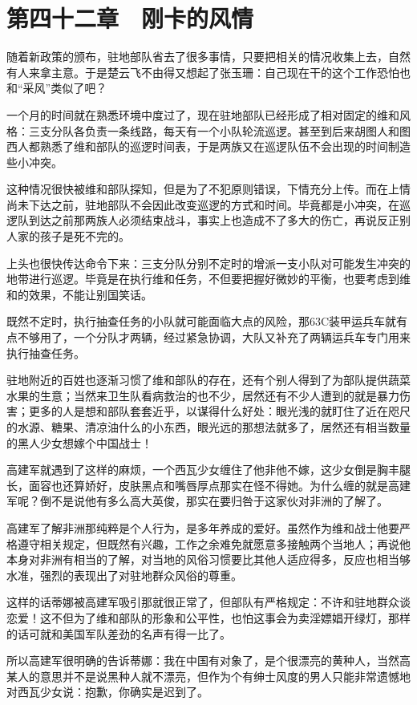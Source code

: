 \section{第四十二章　刚卡的风情}

随着新政策的颁布，驻地部队省去了很多事情，只要把相关的情况收集上去，自然有人来拿主意。于是楚云飞不由得又想起了张玉珊：自己现在干的这个工作恐怕也和“采风”类似了吧？

一个月的时间就在熟悉环境中度过了，现在驻地部队已经形成了相对固定的维和风格：三支分队各负责一条线路，每天有一个小队轮流巡逻。甚至到后来胡图人和图西人都熟悉了维和部队的巡逻时间表，于是两族又在巡逻队伍不会出现的时间制造些小冲突。

这种情况很快被维和部队探知，但是为了不犯原则错误，下情充分上传。而在上情尚未下达之前，驻地部队不会因此改变巡逻的方式和时间。毕竟都是小冲突，在巡逻队到达之前那两族人必须结束战斗，事实上也造成不了多大的伤亡，再说反正别人家的孩子是死不完的。

上头也很快传达命令下来：三支分队分别不定时的增派一支小队对可能发生冲突的地带进行巡逻。毕竟是在执行维和任务，不但要把握好微妙的平衡，也要考虑到维和的效果，不能让别国笑话。

既然不定时，执行抽查任务的小队就可能面临大点的风险，那63C装甲运兵车就有点不够用了，一个分队才两辆，经过紧急协调，大队又补充了两辆运兵车专门用来执行抽查任务。

驻地附近的百姓也逐渐习惯了维和部队的存在，还有个别人得到了为部队提供蔬菜水果的生意；当然来卫生队看病救治的也不少，居然还有不少人遭到的就是暴力伤害；更多的人是想和部队套套近乎，以谋得什么好处：眼光浅的就盯住了近在咫尺的水源、糖果、清凉油什么的小东西，眼光远的那想法就多了，居然还有相当数量的黑人少女想嫁个中国战士！

高建军就遇到了这样的麻烦，一个西瓦少女缠住了他非他不嫁，这少女倒是胸丰腿长，面容也还算娇好，皮肤黑点和嘴唇厚点那实在怪不得她。为什么缠的就是高建军呢？倒不是说他有多么高大英俊，那实在要归咎于这家伙对非洲的了解了。

高建军了解非洲那纯粹是个人行为，是多年养成的爱好。虽然作为维和战士他要严格遵守相关规定，但既然有兴趣，工作之余难免就愿意多接触两个当地人；再说他本身对非洲有相当的了解，对当地的风俗习惯要比其他人适应得多，反应也相当够水准，强烈的表现出了对驻地群众风俗的尊重。

这样的话蒂娜被高建军吸引那就很正常了，但部队有严格规定：不许和驻地群众谈恋爱！这不但为了维和部队的形象和公平性，也怕这事会为卖淫嫖娼开绿灯，那样的话可就和美国军队差劲的名声有得一比了。

所以高建军很明确的告诉蒂娜：我在中国有对象了，是个很漂亮的黄种人，当然高某人的意思并不是说黑种人就不漂亮，但作为个有绅士风度的男人只能非常遗憾地对西瓦少女说：抱歉，你确实是迟到了。

